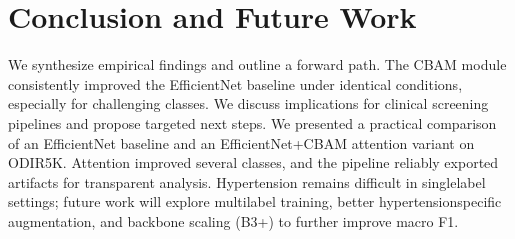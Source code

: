 \chapter{Conclusion and Future Work}
We synthesize empirical findings and outline a forward path. The CBAM module consistently improved the EfficientNet baseline under identical conditions, especially for challenging classes. We discuss implications for clinical screening pipelines and propose targeted next steps.
We presented a practical comparison of an EfficientNet baseline and an EfficientNet+CBAM attention variant on ODIR\textendash 5K. Attention improved several classes, and the pipeline reliably exported artifacts for transparent analysis. Hypertension remains difficult in single\textendash label settings; future work will explore multi\textendash label training, better hypertension\textendash specific augmentation, and backbone scaling (B3+) to further improve macro F1.


